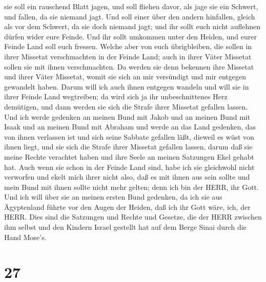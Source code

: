 sie soll ein rauschend Blatt jagen, und soll fliehen davor, als jage sie
ein Schwert, und fallen, da sie niemand jagt.  Und soll
einer über den andern hinfallen, gleich als vor dem Schwert, da sie doch
niemand jagt; und ihr sollt euch nicht auflehnen dürfen wider eure
Feinde.  Und ihr sollt umkommen unter den Heiden, und eurer
Feinde Land soll euch fressen.  Welche aber von euch
übrigbleiben, die sollen in ihrer Missetat verschmachten in der Feinde
Land; auch in ihrer Väter Missetat sollen sie mit ihnen verschmachten.
 Da werden sie denn bekennen ihre Missetat und ihrer Väter
Missetat, womit sie sich an mir versündigt und mir entgegen gewandelt
haben.  Darum will ich auch ihnen entgegen wandeln und will
sie in ihrer Feinde Land wegtreiben; da wird sich ja ihr unbeschnittenes
Herz demütigen, und dann werden sie sich die Strafe ihrer Missetat
gefallen lassen.  Und ich werde gedenken an meinen Bund mit
Jakob und an meinen Bund mit Isaak und an meinen Bund mit Abraham und
werde an das Land gedenken,  das von ihnen verlassen ist
und sich seine Sabbate gefallen läßt, dieweil es wüst von ihnen liegt,
und sie sich die Strafe ihrer Missetat gefallen lassen, darum daß sie
meine Rechte verachtet haben und ihre Seele an meinen Satzungen Ekel
gehabt hat.  Auch wenn sie schon in der Feinde Land sind,
habe ich sie gleichwohl nicht verworfen und ekelt mich ihrer nicht also,
daß es mit ihnen aus sein sollte und mein Bund mit ihnen sollte nicht
mehr gelten; denn ich bin der HERR, ihr Gott.  Und ich will
über sie an meinen ersten Bund gedenken, da ich sie aus Ägyptenland
führte vor den Augen der Heiden, daß ich ihr Gott wäre, ich, der HERR.
 Dies sind die Satzungen und Rechte und Gesetze, die der
HERR zwischen ihm selbst und den Kindern Israel gestellt hat auf dem
Berge Sinai durch die Hand Mose's.

\hypertarget{section-26}{%
\section{27}\label{section-26}}

